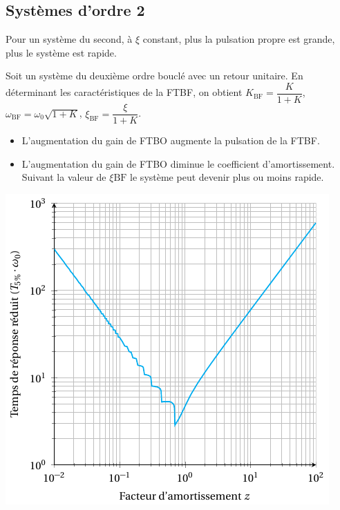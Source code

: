 \documentclass[10pt,fleqn]{article} %
\begin{document}
\subsection{Systèmes d'ordre 2}

\noindent\begin{minipage}[c]{.5\linewidth}
\begin{resultat}
Pour un système du second, à $\xi$ constant, plus la pulsation propre est grande, plus le système est rapide. 
\end{resultat} 



Soit un système du deuxième ordre bouclé avec un retour unitaire. En déterminant les caractéristiques de la FTBF, on obtient $K_{\text{BF}}=\dfrac{K}{1+K}$, $\omega_{\text{BF}}=\omega_0\sqrt{1+K}$, $\xi_{\text{BF}}=\dfrac{\xi}{1+K}$.


\begin{resultat}
\begin{itemize}
\item L'augmentation du gain de FTBO augmente la pulsation de la FTBF. 
\item L'augmentation du gain de FTBO diminue le coefficient d'amortissement. Suivant la valeur de $\xi{\text{BF}}$ le système peut devenir plus ou moins rapide.  
\end{itemize}
\end{resultat}

\end{minipage}\hfill
\begin{minipage}[c]{.47\linewidth}
\begin{center}
\includegraphics[width=\linewidth]{images/image7}
\end{center}
\end{minipage}
\end{document}
